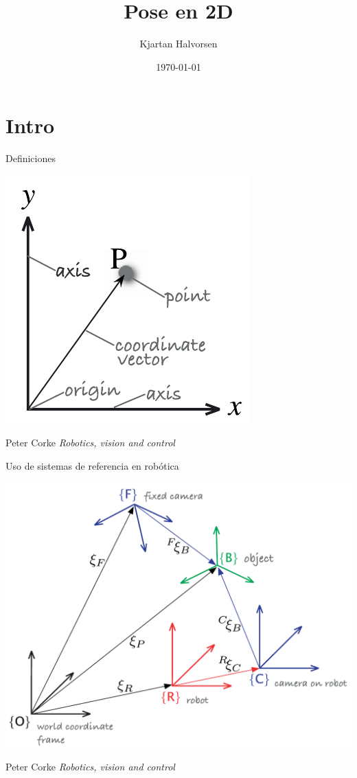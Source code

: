 \documentclass[presentation,aspectratio=169]{beamer}
\author{Kjartan Halvorsen}
\date{\today}
\title{Pose en 2D}
\begin{document}
\maketitle

\section{Intro}
\label{sec:orge97e38b}
\begin{frame}[label={sec:orgd476b22}]{Definiciones}
\begin{center}
\includegraphics[height=0.5\textheight]{../figures/Corke-fig2.1.a.png}

\footnotesize Peter Corke \emph{Robotics, vision and control}
\end{center}
\end{frame}


\begin{frame}[label={sec:org8aaa56b}]{Uso de sistemas de referencia en robótica}
\begin{center}
\includegraphics[height=0.65\textheight]{../figures/Corke-fig2.4.png}

\footnotesize Peter Corke \emph{Robotics, vision and control}
\end{center}
\end{frame}
\end{document}
